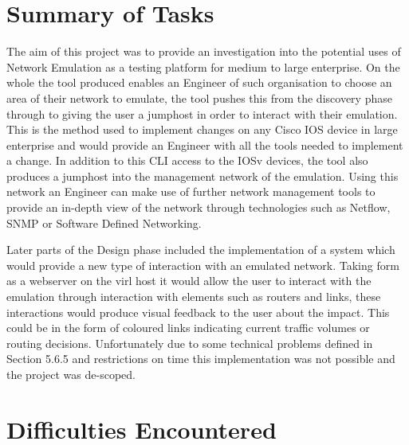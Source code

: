 \documentclass[11pt]{report}
\begin{document}
\section{Summary of Tasks}

The aim of this project was to provide an investigation into the potential uses of Network Emulation as a testing platform for medium to large enterprise. On the whole the tool produced enables an Engineer of such organisation to choose an area of their network to emulate, the tool pushes this from the discovery phase through to giving the user a jumphost in order to interact with their emulation. This is the method used to implement changes on any Cisco IOS device in large enterprise and would provide an Engineer with all the tools needed to implement a change. In addition to this CLI access to the IOSv devices, the tool also produces a jumphost into the management network of the emulation. Using this network an Engineer can make use of further network management tools to provide an in-depth view of the network through technologies such as Netflow, SNMP or Software Defined Networking.

Later parts of the Design phase included the implementation of a system which would provide a new type of interaction with an emulated network. Taking form as a webserver on the virl host it would allow the user to interact with the emulation through interaction with elements such as routers and links, these interactions would produce visual feedback to the user about the impact. This could be in the form of coloured links indicating current traffic volumes or routing decisions. Unfortunately due to some technical problems defined in Section 5.6.5 and restrictions on time this implementation was not possible and the project was de-scoped.

\section{Difficulties Encountered}
\end{document}
